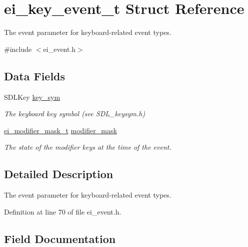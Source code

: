 \hypertarget{structei__key__event__t}{}\section{ei\+\_\+key\+\_\+event\+\_\+t Struct Reference}
\label{structei__key__event__t}


The event parameter for keyboard-\/related event types.  




{\ttfamily \#include $<$ei\+\_\+event.\+h$>$}

\subsection*{Data Fields}
\begin{DoxyCompactItemize}
\item 
S\+D\+L\+Key \hyperlink{structei__key__event__t_a34be444e0f81bfa20e0b053779faf873}{key\+\_\+sym}
\begin{DoxyCompactList}\small\item\em The keyboard key symbol (see S\+D\+L\+\_\+keysym.\+h) \end{DoxyCompactList}\item 
\hyperlink{ei__event_8h_abcdd2ef0f39179463f17a06be9bdf949}{ei\+\_\+modifier\+\_\+mask\+\_\+t} \hyperlink{structei__key__event__t_a35e4dc6d788b9fdd4eeedf716662afab}{modifier\+\_\+mask}
\begin{DoxyCompactList}\small\item\em The state of the modifier keys at the time of the event. \end{DoxyCompactList}\end{DoxyCompactItemize}


\subsection{Detailed Description}
The event parameter for keyboard-\/related event types. 

Definition at line 70 of file ei\+\_\+event.\+h.



\subsection{Field Documentation}
\mbox{\label{structei__key__event__t_a34be444e0f81bfa20e0b053779faf873}} 
